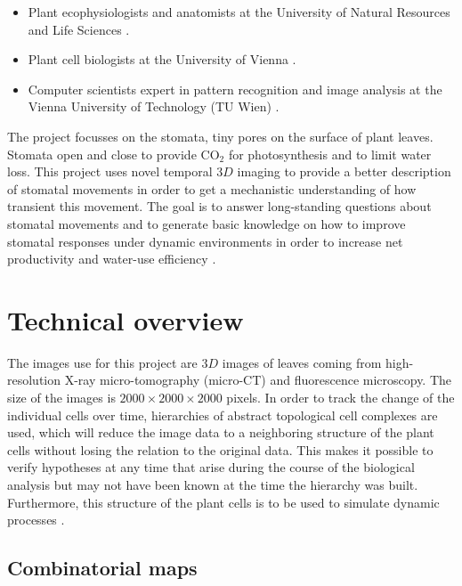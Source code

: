 \begin{itemize}
    \item Plant ecophysiologists and anatomists at the University of Natural Resources 
    and Life Sciences \cite{BOKU}.
    \item Plant cell biologists at the University of Vienna \cite{UVI}.
    \item Computer scientists expert in pattern recognition and image analysis at the 
    Vienna University of Technology (TU Wien) \cite{TUV}.
\end{itemize}
%
The project focusses on the stomata, tiny pores on the surface of plant leaves. 
Stomata open and close to provide $\mathrm{CO_2}$ for photosynthesis and to limit 
water loss. This project uses novel temporal $3D$ imaging to provide a better description 
of stomatal movements in order to get a mechanistic understanding of how transient 
this movement. The goal is to answer long-standing questions about stomatal movements 
and to generate basic knowledge on how to improve stomatal responses under dynamic 
environments in order to increase net productivity and water-use efficiency \cite{WGH}.
         
\section{Technical overview}

The images use for this project are $3D$ images of leaves coming from high-resolution 
X-ray micro-tomography (micro-CT) and fluorescence microscopy. The size of the images is
$2000 \times 2000 \times 2000$ pixels. In order to track the change of the individual 
cells over time, hierarchies of abstract topological cell complexes are used, which will
reduce the image data to a neighboring structure of the plant cells without losing the
relation to the original data. This makes it possible to verify hypotheses at any time
that arise during the course of the biological analysis but may not have been known at
the time the hierarchy was built. Furthermore, this structure of the plant cells is to be
used to simulate dynamic processes \cite{PWGH}.

\subsection{Combinatorial maps}